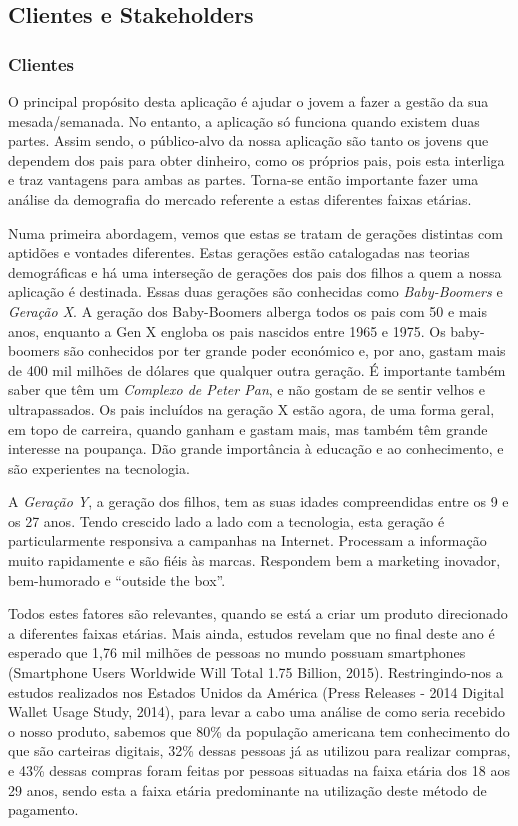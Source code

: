 \documentclass{article}
\begin{document}
  \subsection{Clientes e Stakeholders}
    \subsubsection{Clientes}
      O principal propósito desta aplicação é ajudar o jovem a fazer a gestão da sua mesada/semanada. No entanto, a aplicação só funciona quando existem duas partes. Assim sendo, o público-alvo da nossa aplicação são tanto os jovens que dependem dos pais para obter dinheiro, como os próprios pais, pois esta interliga e traz vantagens para ambas as partes. Torna-se então importante fazer uma análise da demografia do mercado referente a estas diferentes faixas etárias.

      Numa primeira abordagem, vemos que estas se tratam de gerações distintas com aptidões e vontades diferentes. Estas gerações estão catalogadas nas teorias demográficas e há uma interseção de gerações dos pais dos filhos a quem a nossa aplicação é destinada. Essas duas gerações são conhecidas como \emph{Baby-Boomers} e \emph{Geração X}. A geração dos Baby-Boomers alberga todos os pais com 50 e mais anos, enquanto a Gen X engloba os pais nascidos entre 1965 e 1975. Os baby-boomers são conhecidos por ter grande poder económico e, por ano, gastam mais de 400 mil milhões de dólares que qualquer outra geração. É importante também saber que têm um \emph{Complexo de Peter Pan}, e não gostam de se sentir velhos e ultrapassados. Os pais incluídos na geração X estão agora, de uma forma geral, em topo de carreira, quando ganham e gastam mais, mas também têm grande interesse na poupança. Dão grande importância à educação e ao conhecimento, e são experientes na tecnologia.

      A \emph{Geração Y}, a geração dos filhos, tem as suas idades compreendidas entre os 9 e os 27 anos. Tendo crescido lado a lado com a tecnologia, esta geração é particularmente responsiva a campanhas na Internet. Processam a informação muito rapidamente e são fiéis às marcas. Respondem bem a marketing inovador, bem-humorado e ``outside the box''.

      Todos estes fatores são relevantes, quando se está a criar um produto direcionado a diferentes faixas etárias. Mais ainda, estudos revelam que no final deste ano é esperado que 1,76 mil milhões de pessoas no mundo possuam smartphones (Smartphone Users Worldwide Will Total 1.75 Billion, 2015). Restringindo-nos a estudos realizados nos Estados Unidos da América (Press Releases - 2014 Digital Wallet Usage Study, 2014), para levar a cabo uma análise de como seria recebido o nosso produto, sabemos que 80\% da população americana tem conhecimento do que são carteiras digitais, 32\% dessas pessoas já as utilizou para realizar compras, e 43\% dessas compras foram feitas por pessoas situadas na faixa etária dos 18 aos 29 anos, sendo esta a faixa etária predominante na utilização deste método de pagamento.
\end{document}

